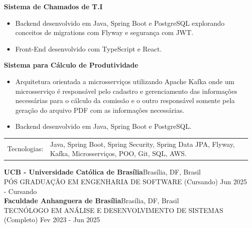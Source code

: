     \vspace{2mm}
    
    \textbf{Sistema de Chamados de T.I} \hfill\\
    \vspace{-3mm}
    \begin{itemize} \itemsep -3pt
        \item Backend desenvolvido em Java, Spring Boot e PostgreSQL explorando conceitos de migrations com Flyway e segurança com JWT.
        \item Front-End desenvolvido com TypeScript e React.
    \end{itemize}
    
    \textbf{Sistema para Cálculo de Produtividade} \hfill\\
    \vspace{-3mm}
    \begin{itemize} \itemsep -3pt
        \item Arquitetura orientada a microsserviços utilizando Apache Kafka onde um microsserviço é responsável pelo cadastro e gerenciamento das informações necessárias para o cálculo da comissão e o outro responsável somente pela geração do arquivo PDF com as informações necessárias.
        \item Backend desenvolvido em Java, Spring Boot e PostgreSQL.
    \end{itemize}

    \vspace{2mm}
    \begin{longtable}{p{4cm}p{12cm}}
        Tecnologias: & Java, Spring Boot, Spring Security, Spring Data JPA, Flyway, Kafka, Microsserviços, POO, Git, SQL, AWS. \\
    \end{longtable}
    \vspace{1mm}

    \vspace{2mm}
    \textbf{UCB - Universidade Católica de Brasília}\hfill Brasília, DF, Brasil\\
    PÓS GRADUAÇÃO EM ENGENHARIA DE SOFTWARE (Cursando) \hfill Jun 2025 - Cursando\\
    \vspace{2mm}
    \textbf{Faculdade Anhanguera de Brasília}\hfill Brasília, DF, Brasil\\
    TECNÓLOGO EM ANÁLISE E DESENVOLVIMENTO DE SISTEMAS (Completo) \hfill Fev 2023 - Jun 2025\\


